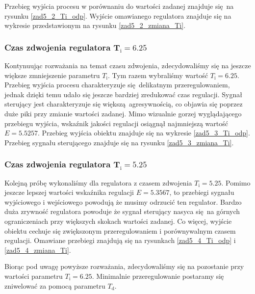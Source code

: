 Przebieg wyjścia procesu w porównaniu do wartości zadanej znajduje się na rysunku \ref{zad5_2_Ti_odp}.
Wyjście omawianego regulatora znajduje się na wykresie przedstawionym na rysunku \ref{zad5_2_zmiana_Ti}. 

\subsubsection{Czas zdwojenia regulatora $\mathbf{T_{\mathrm{i}}}=\num{6,25}$}
Kontynuując rozważania na temat czasu zdwojenia, zdecydowaliśmy się na jeszcze większe zmniejszenie 
parametru $T_{\mathrm{i}}$. Tym razem wybraliśmy wartość $T_{\mathrm{i}}=\num{6,25}$. Przebieg 
wyjścia procesu charakteryzuje się delikatnym przeregulowaniem, jednak dzięki temu udało się
jeszcze bardziej zredukować czas regulacji. Sygnał sterujący jest charakteryzuje się
większą agresywnością, co objawia się poprzez duże piki przy zmianie wartości zadanej.
Mimo wizualnie gorzej wyglądającego przebiegu wyjścia, wskaźnik jakości regulacji osiągnął najmniejszą
wartość $E=\num{5,5257}$. Przebieg wyjścia obiektu znajduje się na wykresie \ref{zad5_3_Ti_odp}. 
Przebieg sygnału sterującego znajduje się na rysunku \ref{zad5_3_zmiana_Ti}.

\subsubsection{Czas zdwojenia regulatora $\mathbf{T_{\mathrm{i}}}=\num{5,25}$}
Kolejną próbę wykonaliśmy dla regulatora z czasem zdwojenia $T_{\mathrm{i}}=\num{5,25}$. Pomimo
jeszcze lepszej wartości wskaźnika regulacji $E=\num{5,3567}$, to przebiegi sygnału wyjściowego i wejściowego
powodują że musimy odrzucić ten regulator. Bardzo duża zrywność regulatora powoduje że 
sygnał sterujący nasyca się na górnych ograniczeniach przy większych skokach wartości zadanej. Co więcej,
wyjście obiektu cechuje się zwiększonym przeregulowaniem i porównywalnym czasem regulacji. Omawiane przebiegi
znajdują się na rysunkach \ref{zad5_4_Ti_odp} i \ref{zad5_4_zmiana_Ti}. 

Biorąc pod uwagę powyższe rozważania, zdecydowaliśmy się na pozostanie przy wartości parametru $T_{\mathrm{i}} = \num{6,25}$.
Minimalnie przeregulowanie postaramy się zniwelować za pomocą parametru $T_{\mathrm{d}}$. 


